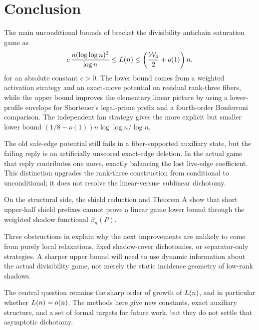 \section{Conclusion}\label{sec:conclusion}

The main unconditional bounds of
 bracket the divisibility antichain
saturation game as
\[
  c\,\frac{n(\log\log n)^2}{\log n}
  \le
  L(n)
  \le
  \left(\frac{\mathcal{W}_4}{2}+o(1)\right)n.
\]
for an absolute constant $c>0$.  The lower bound comes from a weighted
activation strategy and an exact-move potential on residual rank-three fibers,
while the upper bound improves the elementary linear picture by using a
lower-profile envelope for Shortener's legal-prime prefix and a fourth-order
Bonferroni comparison.  The independent fan strategy gives the more explicit
but smaller lower bound
$(1/8-o(1))n\log\log n/\log n$.

The old safe-edge potential still fails in a fiber-supported auxiliary state,
but the failing reply is an artificially unscored exact-edge deletion.  In the
actual game that reply contributes one move, exactly balancing the lost
live-edge coefficient.  This distinction upgrades the rank-three construction
from conditional to unconditional; it does not resolve the linear-versus-
sublinear dichotomy.

On the structural side, the shield reduction and Theorem A show that short
upper-half shield prefixes cannot prove a linear game lower bound through the
weighted shadow functional $\beta_n(P)$.

Three obstructions in  explain why the next improvements
are unlikely to come from purely local relaxations, fixed shadow-cover
dichotomies, or separator-only strategies.  A sharper upper bound will need to
use dynamic information about the actual divisibility game, not merely the
static incidence geometry of low-rank shadows.

The central question remains the sharp order of growth of $L(n)$, and in
particular whether $L(n)=o(n)$.  The methods here give new constants, exact
auxiliary structure, and a set of formal targets for future work, but they do
not settle that asymptotic dichotomy.
